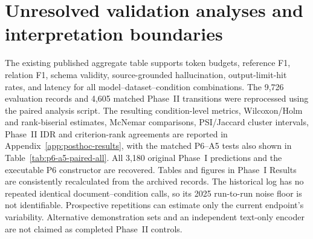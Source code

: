 \documentclass[fleqn,10pt]{wlscirep-authoryear}
\begin{document}
\section{Unresolved validation analyses and interpretation boundaries}
\label{app:audit}
The existing published aggregate table supports token budgets, reference F1,
relation F1, schema validity, source-grounded hallucination, output-limit-hit
rates, and latency for all model--dataset--condition combinations. %
The 9,726 evaluation records and 4,605 matched Phase~II transitions were
reprocessed using the paired analysis script. The resulting condition-level
metrics, Wilcoxon/Holm and rank-biserial estimates, McNemar comparisons,
PSI/Jaccard cluster intervals, Phase~II IDR and criterion-rank agreements are
reported in Appendix~\ref{app:posthoc-results}, with the matched P6--A5 tests
also shown in Table~\ref{tab:p6-a5-paired-all}.
All 3,180 original Phase~I predictions and the executable P6 constructor
are recovered. Tables and figures in Phase~I Results are consistently
recalculated from the archived records. The historical log has no repeated
identical document--condition calls, so its 2025 run-to-run noise floor is
not identifiable. Prospective repetitions can estimate only the current
endpoint's variability. Alternative demonstration sets and an independent
text-only encoder are not claimed as completed Phase~II controls.



\end{document}
